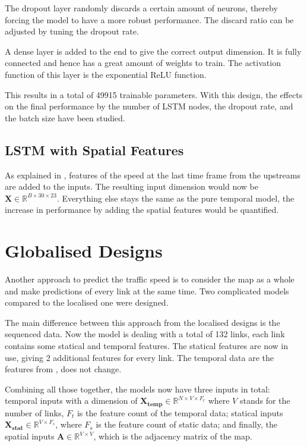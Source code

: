 The dropout layer randomly discards a certain amount of neurons, thereby forcing the model to have a more robust performance. 
The discard ratio can be adjusted by tuning the dropout rate. 

A dense layer is added to the end to give the correct output dimension. It is fully connected and hence has a great amount of weights to train. 
The activation function of this layer is the exponential ReLU function. 

This results in a total of 49915 trainable parameters. 
With this design, the effects on the final performance by the number of LSTM nodes, the dropout rate, and the batch size have been studied. 

\subsection{LSTM with Spatial Features}

As explained in , features of the speed at the last time frame from the upstreams are added to the inputs. 
The resulting input dimension would now be $\mathbf{X} \in \mathbb{R}^{B\times 30\times 23}$. 
Everything else stays the same as the pure temporal model, the increase in performance by adding the spatial features would be quantified.

\section{Globalised Designs}

Another approach to predict the traffic speed is to consider the map as a whole and make predictions of every link at the same time. 
Two complicated models compared to the localised one were designed. 

The main difference between this approach from the localised designs is the sequenced data. Now the model is dealing with a total of 132 links, each link contains some statical and temporal features. 
The statical features are now in use, giving 2 additional features for every link. 
The temporal data are the features from , does not change.

Combining all those together, the models now have three inputs in total: temporal inputs with a dimension of $\mathbf{X_{temp}} \in \mathbb{R}^{N\times V\times F_t}$ where $V$ stands for the number of links, $F_t$ is the feature count of the temporal data; 
statical inputs $\mathbf{X_{stat}} \in \mathbb{R}^{V\times F_s}$, where $F_s$ is the feature count of static data; and finally, the spatial inputs $\mathbf{A} \in \mathbb{R}^{V\times V}$, which is the adjacency matrix of the map. 

